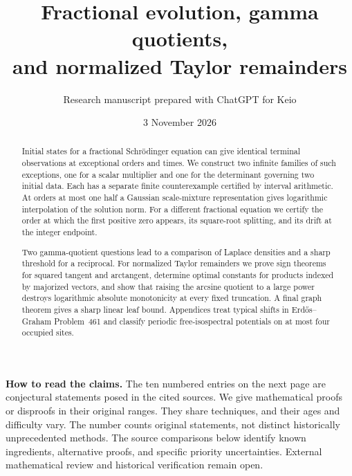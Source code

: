 \documentclass[11pt,a4paper]{article}
\title{Fractional evolution, gamma quotients,\protect\\and normalized Taylor remainders}
\author{Research manuscript prepared with ChatGPT for Keio}
\date{3 November 2026}
\numberwithin{equation}{section}
\begin{document}
\maketitle
\begin{abstract}
Initial states for a fractional Schr\"odinger equation can give identical
terminal observations at exceptional orders and times. We construct two
infinite families of such exceptions, one for a scalar multiplier and
one for the determinant governing two initial data. Each has a separate
finite counterexample certified by interval arithmetic. At orders at most
one half a Gaussian scale-mixture representation gives logarithmic
interpolation of the solution norm. For a different fractional equation
we certify the order at which the first positive zero appears, its
square-root splitting, and its drift at the integer endpoint.

Two gamma-quotient questions lead to a comparison of Laplace densities
and a sharp threshold for a reciprocal. For normalized Taylor remainders
we prove sign theorems for squared tangent and arctangent, determine
optimal constants for products indexed by majorized vectors, and show
that raising the arcsine quotient to a large power destroys logarithmic
absolute monotonicity at every fixed truncation. A final graph theorem
gives a sharp linear leaf bound. Appendices treat typical shifts in
Erd\H{o}s--Graham Problem~461 and classify periodic free-isospectral
potentials on at most four occupied sites.
\end{abstract}
\medskip
\noindent\textbf{How to read the claims.}
The ten numbered entries on the next page are conjectural statements
posed in the cited sources. We give mathematical proofs or disproofs
in their original ranges. They share techniques, and their ages and
difficulty vary. The number counts original statements, not distinct
historically unprecedented methods. The source comparisons below
identify known ingredients, alternative proofs, and specific priority
uncertainties. External mathematical review and historical verification
remain open.
\clearpage
\end{document}
